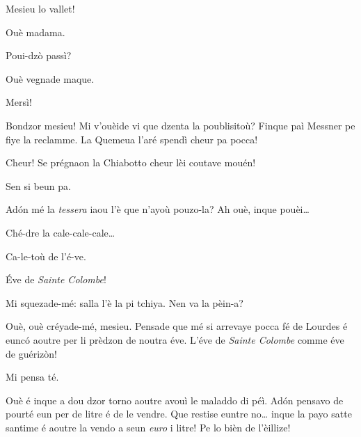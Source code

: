 \begin{drama}

\Seurspeaks Mesieu lo vallet!

\Valletspeaks Ouè madama.

\Seurspeaks Poui-dzò passì?

\Valletspeaks Ouè vegnade maque.

\Seurspeaks Mersì!


\Seurspeaks{} Bondzor mesieu! Mi v'ouèide vi que dzenta la poublisitoù? Finque paì Messner pe fiye la reclamme. La Quemeua l'aré spendì cheur pa pocca!

\Pierluigispeaks Cheur! Se prégnaon la Chiabotto cheur lèi coutave mouén!

\Seurspeaks Sen si beun pa.


\Seurspeaks{} Ad\'on mé la \textit{tessera} iaou l'è que n'ayoù pouzo-la? Ah ouè, inque pouèi\ldots


\Machinaspeaks Ché-dre la cale-cale-cale\ldots


\Machinaspeaks Ca-le-toù de l'é-ve.

\Seurspeaks  \'Eve de \textit{Sainte Colombe}!

\Pierluigispeaks Mi squezade-mé: salla l'è la pi tchiya. Nen va la pèin-a?

\Seurspeaks Ouè, ouè créyade-mé, mesieu. Pensade que mé si arrevaye pocca fé de Lourdes é eunc\'o aoutre per li prèdzon de noutra éve. L'éve de \textit{Sainte Colombe} comme éve de guérizòn!

\Pierluigispeaks Mi pensa té.

\Seurspeaks Ouè é inque a dou dzor torno aoutre avouì le maladdo di péì. Ad\'on pensavo de pourté eun per de litre é de le vendre. Que restise euntre no\ldots {} inque la payo satte santime é aoutre la vendo a seun \textit{euro} i litre! Pe lo bièn de l’èillize!


\end{drama}
